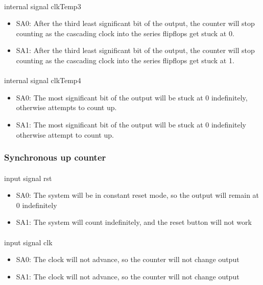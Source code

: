 \documentclass{article}
\begin{document}
	\paragraph{} internal signal clkTemp3
	\begin{itemize}
		\item SA0: After the third least significant bit  of the output, the counter will stop counting as the  cascading clock into the series flipflops get stuck at 0.
		\item SA1: After the third least significant bit  of the output, the counter will stop counting as the  cascading clock into the series flipflops get stuck at 1. 
	\end{itemize}

	\paragraph{} internal signal clkTemp4
	\begin{itemize}
		\item SA0: The most significant bit of the output will be stuck at 0 indefinitely, otherwise attempts to count up.
		\item SA1: The most significant bit of the output will be stuck at 0 indefinitely otherwise attempt to count up.
	\end{itemize}

  \subsubsection{Synchronous up counter}
  	\paragraph{} input signal rst
  	\begin{itemize}
  		\item SA0: The system will be in constant reset mode, so the output will remain at 0 indefinitely
  		\item SA1: The system will count indefinitely, and the reset button will not work
  	\end{itemize}

  	\paragraph{} input signal clk
  	\begin{itemize}
  		\item SA0: The clock will not advance, so the counter will not change output
  		\item SA1: The clock will not advance, so the counter will not change output
  	\end{itemize}
\end{document}
